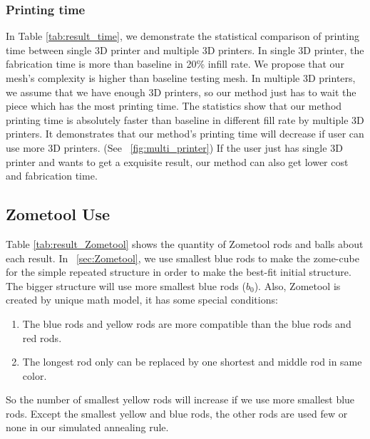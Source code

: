 \subsubsection{Printing time}
In Table \ref{tab:result_time}, we demonstrate the statistical comparison of printing time between single 3{D} printer and multiple 3{D} printers. In single 3{D} printer, the fabrication time is more than baseline in 20\% infill rate. We propose that our mesh's complexity is higher than baseline testing mesh. In multiple 3{D} printers, we assume that we have enough 3{D} printers, so our method just has to wait the piece which has the most printing time. The statistics show that our method printing time is absolutely faster than baseline in different fill rate by multiple 3{D} printers. It demonstrates that our method's printing time will decrease if user can use more 3{D} printers. (See \figname~\ref{fig:multi_printer}) If the user just has single 3{D} printer and wants to get a exquisite result, our method can also get lower cost and fabrication time.

\subsection{Zometool Use}
Table \ref{tab:result_Zometool} shows the quantity of Zometool rods and balls about each result. In \secname~\ref{sec:Zometool}, we use smallest blue rods to make the zome-cube for the simple repeated structure in order to make the best-fit initial structure. The bigger structure will use more smallest blue rods (${b_0}$). Also, Zometool is created by unique math model, it has some special conditions: 
\begin{enumerate}
\item The blue rods and yellow rods are more compatible than the blue rods and red rods. 
\item  The longest rod only can be replaced by one shortest and middle rod in same color.
\end{enumerate}

So the number of smallest
yellow rods will increase if we use more smallest blue rods. Except the smallest yellow and blue rods, the other rods are used few or none in our simulated annealing rule.


